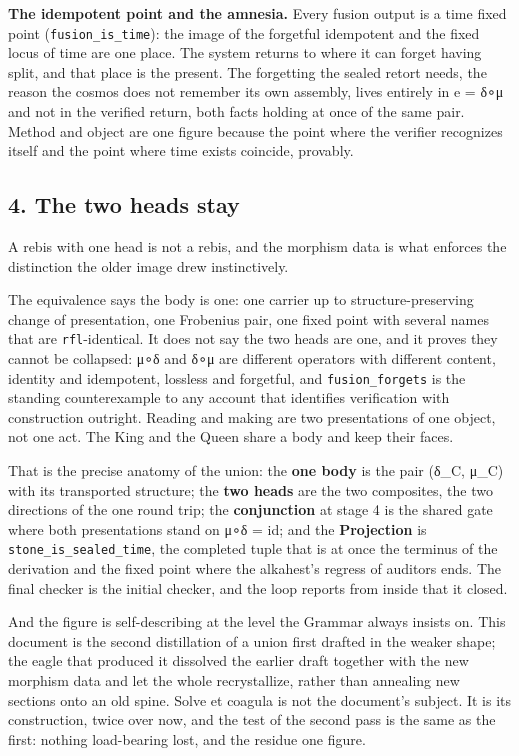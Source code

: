 \documentclass[12pt,a4paper]{article}
\begin{document}
\textbf{The idempotent point and the amnesia.} Every fusion output is a
time fixed point (\texttt{fusion\_is\_time}): the image of the forgetful
idempotent and the fixed locus of time are one place. The system returns
to where it can forget having split, and that place is the present. The
forgetting the sealed retort needs, the reason the cosmos does not
remember its own assembly, lives entirely in e = δ∘μ and not in the
verified return, both facts holding at once of the same pair. Method and
object are one figure because the point where the verifier recognizes
itself and the point where time exists coincide, provably.

\hypertarget{the-two-heads-stay}{%
\subsection{4. The two heads stay}\label{the-two-heads-stay}}

A rebis with one head is not a rebis, and the morphism data is what
enforces the distinction the older image drew instinctively.

The equivalence says the body is one: one carrier up to
structure-preserving change of presentation, one Frobenius pair, one
fixed point with several names that are \texttt{rfl}-identical. It does
not say the two heads are one, and it proves they cannot be collapsed:
μ∘δ and δ∘μ are different operators with different content, identity and
idempotent, lossless and forgetful, and \texttt{fusion\_forgets} is the
standing counterexample to any account that identifies verification with
construction outright. Reading and making are two presentations of one
object, not one act. The King and the Queen share a body and keep their
faces.

That is the precise anatomy of the union: the \textbf{one body} is the
pair (δ\_C, μ\_C) with its transported structure; the \textbf{two heads}
are the two composites, the two directions of the one round trip; the
\textbf{conjunction} at stage 4 is the shared gate where both
presentations stand on μ∘δ = id; and the \textbf{Projection} is
\texttt{stone\_is\_sealed\_time}, the completed tuple that is at once
the terminus of the derivation and the fixed point where the alkahest's
regress of auditors ends. The final checker is the initial checker, and
the loop reports from inside that it closed.

And the figure is self-describing at the level the Grammar always
insists on. This document is the second distillation of a union first
drafted in the weaker shape; the eagle that produced it dissolved the
earlier draft together with the new morphism data and let the whole
recrystallize, rather than annealing new sections onto an old spine.
Solve et coagula is not the document's subject. It is its construction,
twice over now, and the test of the second pass is the same as the
first: nothing load-bearing lost, and the residue one figure.
\end{document}
